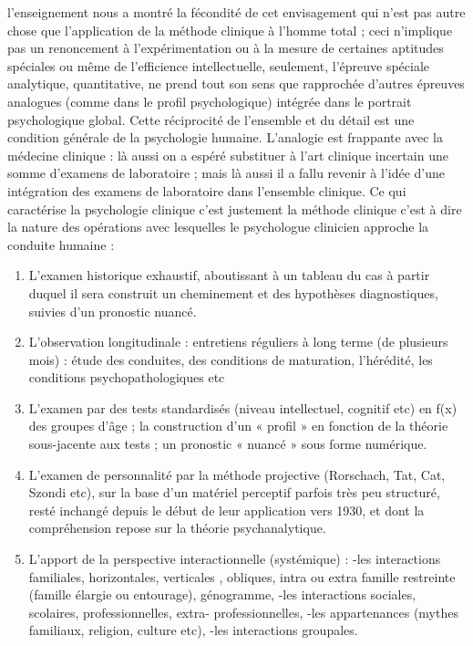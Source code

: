 l’enseignement nous a montré la fécondité de cet envisagement qui
n’est pas autre chose que l’application de la méthode clinique à
l’homme total  ; ceci n’implique pas un renoncement à l’expérimentation
ou à la mesure de certaines aptitudes spéciales ou même de
l’efficience intellectuelle, seulement, l’épreuve spéciale analytique,
quantitative, ne prend tout son sens que rapprochée d’autres épreuves
analogues (comme dans le profil psychologique) intégrée dans le
portrait psychologique global. Cette réciprocité de l’ensemble et du
détail est une condition générale de la psychologie humaine.%
L’analogie est frappante avec la médecine clinique : là aussi on a espéré substituer à l’art clinique incertain une somme d’examens de laboratoire ; mais là aussi il a fallu revenir à l’idée d’une intégration des examens de laboratoire dans l’ensemble clinique.
Ce qui caractérise la psychologie clinique c’est justement la méthode
clinique c’est à dire la nature des opérations avec lesquelles le
psychologue clinicien approche la conduite humaine :
\begin{enumerate}
 \item L’examen historique exhaustif, aboutissant à un tableau du cas à partir duquel il sera construit un cheminement et des hypothèses diagnostiques, suivies d’un pronostic nuancé.
\item L’observation longitudinale : entretiens réguliers à long terme (de plusieurs mois) : étude des conduites, des conditions de maturation, l’hérédité, les conditions psychopathologiques etc
\item L’examen par des tests standardisés (niveau intellectuel, cognitif etc) en f(x) des groupes d’âge ; la construction d’un « profil » en fonction de la théorie sous-jacente aux tests ; un pronostic « nuancé » sous forme numérique.
\item L’examen de personnalité par la méthode projective (Rorschach,
  Tat, Cat, Szondi etc), sur la base d’un matériel perceptif parfois
  très peu structuré, resté inchangé depuis le début de leur
  application vers 1930, et dont la compréhension repose sur la théorie psychanalytique.
\item L’apport de la perspective interactionnelle (systémique) :
-les interactions familiales, horizontales, verticales , obliques, intra ou extra famille restreinte (famille élargie ou entourage), génogramme,
-les interactions sociales, scolaires, professionnelles, extra- professionnelles, -les appartenances (mythes familiaux, religion, culture etc),
-les interactions groupales.
\end{enumerate}
